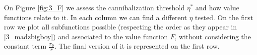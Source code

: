 On Figure \ref{fig:3_F} we assess the cannibalization threshold $\eta^*$ and how value functions relate to it. In each column we can find a different $\eta$ tested. On the first row we plot all subfunctions possible (respecting the order as they appear in \eqref{3_madzbigboy}) and associated to the value function $F$, without considering the constant term $\frac{\pi_0}{r}$. The final version of it is represented on the first row.



